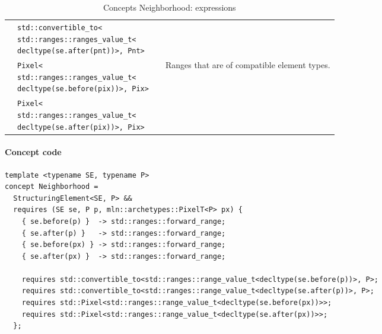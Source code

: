 \begin{table}[htbp]
\begin{scriptsize}
\begin{tabular}{llll}
      \multicolumn{1}{c|}{}                              & \makecell[l]{\texttt{std::convertible\_to<}                                                                                                              \\\texttt{std::ranges::ranges\_value\_t<}\\\texttt{decltype(se.after(pnt))>, Pnt>}}  &                                               &                                                                    \\
      \multicolumn{1}{c|}{}                              & \makecell[l]{\texttt{Pixel<}                                                                                                                             \\\texttt{std::ranges::ranges\_value\_t<}\\\texttt{decltype(se.before(pix))>, Pix>}}                 &                                               & \multirow{2}{*}{Ranges that are of compatible element types.}      \\
      \multicolumn{1}{c|}{}                              & \makecell[l]{\texttt{Pixel<}                                                                                                                             \\\texttt{std::ranges::ranges\_value\_t<}\\\texttt{decltype(se.after(pix))>, Pix>}}                  &                                               &                                                                    \\
      \cline{1-4}
    \end{tabular}
    \smallskip

    \caption{Concepts Neighborhood: expressions}
  \end{scriptsize}
  \label{table:concept.nbh.expressions}
\end{table}

\paragraph{Concept code}

\begin{verbatim}
template <typename SE, typename P>
concept Neighborhood =
  StructuringElement<SE, P> &&
  requires (SE se, P p, mln::archetypes::PixelT<P> px) {
    { se.before(p) }  -> std::ranges::forward_range;
    { se.after(p) }   -> std::ranges::forward_range;
    { se.before(px) } -> std::ranges::forward_range;
    { se.after(px) }  -> std::ranges::forward_range;

    requires std::convertible_to<std::ranges::range_value_t<decltype(se.before(p))>, P>;
    requires std::convertible_to<std::ranges::range_value_t<decltype(se.after(p))>, P>;
    requires std::Pixel<std::ranges::range_value_t<decltype(se.before(px))>>;
    requires std::Pixel<std::ranges::range_value_t<decltype(se.after(px))>>;
  };
\end{verbatim}

